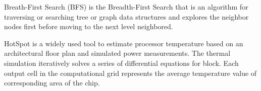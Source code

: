   Breath-First Search (BFS) is the Breadth-First Search that is an algorithm for traversing or searching tree or graph data structures and explores the neighbor nodes first before moving to the next level neighbored.

  HotSpot is a widely used tool \cite{R:24} to estimate processor temperature based on an architectural floor plan and simulated power measurements. The thermal simulation iteratively solves a series of differential equations for block. Each output cell in the computational grid represents the average temperature value of corresponding area of the chip.

  